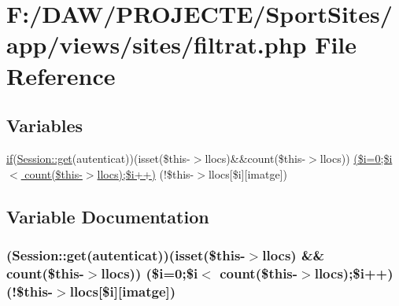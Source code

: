 \hypertarget{filtrat_8php}{}\section{F\+:/\+D\+A\+W/\+P\+R\+O\+J\+E\+C\+T\+E/\+Sport\+Sites/app/views/sites/filtrat.php File Reference}
\label{filtrat_8php}
\subsection*{Variables}
\begin{DoxyCompactItemize}
\item 
\hyperlink{app_2views_2index_2index_8php_af71ebd4d252438a1590e85e150ce8954}{if}(\hyperlink{class_session_acf4e501ef0dfb6e98762fbecc9d75b9a}{Session\+::get}(\textquotesingle{}autenticat\textquotesingle{}))(isset(\$this-\/$>$llocs)\&\&count(\$this-\/$>$llocs)) \hyperlink{filtrat_8php_a48ba74bce45612975fa340b1bb761e7d}{(\$i=0;\$i$<$ count(\$this-\/$>$llocs);\$i++)} (!\$this-\/$>$llocs\mbox{[}\$i\mbox{]}\mbox{[}\textquotesingle{}imatge\textquotesingle{}\mbox{]})
\end{DoxyCompactItemize}


\subsection{Variable Documentation}
\hypertarget{filtrat_8php_a48ba74bce45612975fa340b1bb761e7d}{}
\subsubsection[{(\$i=0;\$i$<$ count(\$this-\/$>$llocs);\$i++)}]{({\bf Session\+::get}(\textquotesingle{}autenticat\textquotesingle{}))(isset(\$this-\/$>$llocs) \&\& count(\$this-\/$>$llocs)) (\$i=0;\$i$<$ count(\$this-\/$>$llocs);\$i++)(!\$this-\/$>$llocs\mbox{[}\$i\mbox{]}\mbox{[}\textquotesingle{}imatge\textquotesingle{}\mbox{]})}\label{filtrat_8php_a48ba74bce45612975fa340b1bb761e7d}
